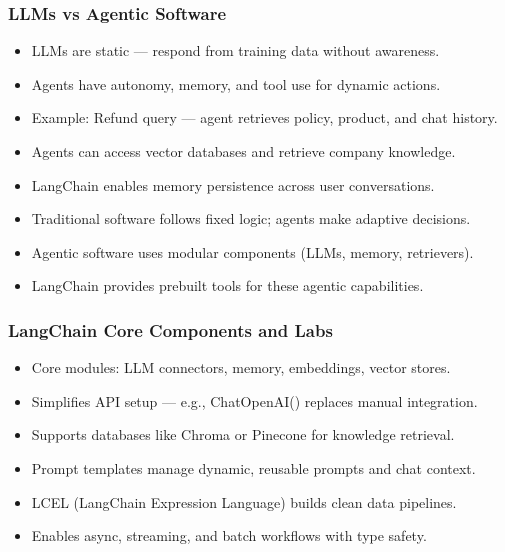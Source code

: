 \begin{frame}[fragile]\frametitle{LLMs vs Agentic Software}
    \begin{itemize}
        \item LLMs are static — respond from training data without awareness.
        \item Agents have autonomy, memory, and tool use for dynamic actions.
        \item Example: Refund query — agent retrieves policy, product, and chat history.
        \item Agents can access vector databases and retrieve company knowledge.
        \item LangChain enables memory persistence across user conversations.
        \item Traditional software follows fixed logic; agents make adaptive decisions.
        \item Agentic software uses modular components (LLMs, memory, retrievers).
        \item LangChain provides prebuilt tools for these agentic capabilities.
    \end{itemize}
\end{frame}

\begin{frame}[fragile]\frametitle{LangChain Core Components and Labs}
    \begin{itemize}
        \item Core modules: LLM connectors, memory, embeddings, vector stores.
        \item Simplifies API setup — e.g., ChatOpenAI() replaces manual integration.
        \item Supports databases like Chroma or Pinecone for knowledge retrieval.
        \item Prompt templates manage dynamic, reusable prompts and chat context.
        \item LCEL (LangChain Expression Language) builds clean data pipelines.
        \item Enables async, streaming, and batch workflows with type safety.
    \end{itemize}
\end{frame}

